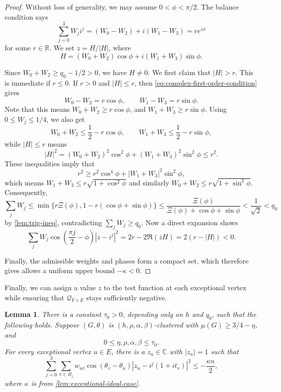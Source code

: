 \documentclass[reqno,11pt]{amsart}
\newtheorem{lemma}{Lemma}
\theoremstyle{definition}
\newcommand{\CC}{\mathbb{C}}
\newcommand{\RR}{\mathbb{R}}
\newcommand{\abs}[1]{\left\lvert #1\right\rvert}
\newcommand{\paren}[1]{\left(#1\right)}
\begin{document}
\begin{proof}
Without loss of generality, we may assume $0<\phi<\pi/2$. The balance condition says
\begin{equation}\label{eq:complex-first-order-condition}
    \sum_{j=0}^3W_ji^j
    =(W_0-W_2)+i(W_1-W_3)=re^{i\phi}
\end{equation}
for some $r\in\RR$.  We set $z = H/|H|$, where 
\[
    H=(W_0+W_2)\cos\phi+i(W_1+W_3)\sin\phi.
\]

Since $W_0+W_2\ge q_0-1/2>0$, we have $H\ne0$. We first claim that $\abs H>r$.  This is immediate if $r\le0$.  If $r>0$ and
$\abs H\le r$, then \eqref{eq:complex-first-order-condition} gives
\[
  W_0-W_2=r\cos\phi,\qquad W_1-W_3=r\sin\phi.
\]
Note that this means $W_0+W_2\ge r\cos\phi$, and  $W_1+W_3\ge r\sin\phi$. Using $0\le W_j\le1/4$, we also get
\[
  W_0+W_2\le\frac12-r\cos\phi,
  \qquad
  W_1+W_3\le\frac12-r\sin\phi,
\]
while $|H| \leq r$ means
\[
\abs H^2
=(W_0+W_2)^2\cos^2\phi+(W_1+W_3)^2\sin^2\phi\le r^2.
\]
These inequalities imply that 
\begin{equation*}
    r^2 \geq r^2 \cos^4 \phi + |W_1 + W_3|^2 \sin^2 \phi,
\end{equation*}
which means $W_1+W_3\le r\sqrt{1+\cos^2\phi}$ and similarly $W_0+W_2\le r\sqrt{1+\sin^2\phi}$. Consequently, 
\[
\sum_jW_j
\le\min\bigl\{r\Xi(\phi),
       1-r(\cos\phi+\sin\phi)\bigr\}
\le\frac{\Xi(\phi)}
        {\Xi(\phi)+\cos\phi+\sin\phi}
<\frac1{\sqrt2}<q_0
\]
by \cref{lem:trig-ineq}, contradicting $\sum_jW_j\ge q_0$. Now a direct expansion shows
\begin{equation}\label{eq:ideal-test-expansion}
\sum_jW_j\cos\paren{\frac{\pi j}{2}-\phi}\abs{z-i^j}^2 =2r-2\Re(\overline zH) =2(r-\abs H)<0.
\end{equation}

Finally, the admissible weights and phases form a compact set, which therefore gives allows a uniform upper bound $-\kappa<0$.
\end{proof}


Finally, we can assign a value $z$ to the test function at each exceptional vertex while ensuring that $\mathcal{Q}_{V \times E}$ stays sufficiently negative. 

\begin{lemma}\label{lem:exceptional-vertex-main}
There is a constant $\tau_0>0$, depending only on $h$ and $q_0$, such that the
following holds.  Suppose $(G,\theta)$ is
$(h,\rho,\alpha,\beta)$-clustered with $\mu(G)\ge3/4-\eta$, and
\[
    0\le\eta,\rho,\alpha,\beta\le\tau_0.
\]
For every exceptional vertex $u\in E$, there is a $z_u\in\CC$ with
$\abs{z_u}=1$ such that
\begin{equation}\label{eq:exceptional-vertex-negative}
\sum_{j=0}^3\sum_{v\in B_j}
w_{uv}\cos(\theta_v-\theta_u)
\abs{z_u-i^j(1+it_v)}^2
\le-\frac{\kappa n}{2},
\end{equation}
where $\kappa$ is from \cref{lem:exceptional-ideal-case}.
\end{lemma}
\end{document}
